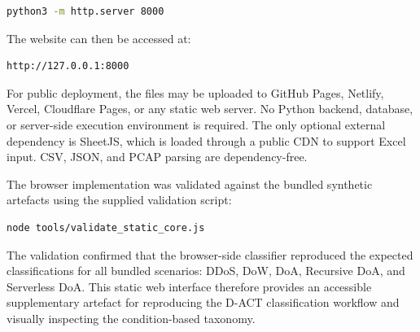 \begin{lstlisting}[language=bash]
python3 -m http.server 8000
\end{lstlisting}

The website can then be accessed at:

\begin{lstlisting}
http://127.0.0.1:8000
\end{lstlisting}

For public deployment, the files may be uploaded to GitHub Pages, Netlify, Vercel, Cloudflare Pages, or any static web server. No Python backend, database, or server-side execution environment is required. The only optional external dependency is SheetJS, which is loaded through a public CDN to support Excel input. CSV, JSON, and PCAP parsing are dependency-free.

The browser implementation was validated against the bundled synthetic artefacts using the supplied validation script:

\begin{lstlisting}[language=bash]
node tools/validate_static_core.js
\end{lstlisting}

The validation confirmed that the browser-side classifier reproduced the expected classifications for all bundled scenarios: DDoS, DoW, DoA, Recursive DoA, and Serverless DoA. This static web interface therefore provides an accessible supplementary artefact for reproducing the D-ACT classification workflow and visually inspecting the condition-based taxonomy.
